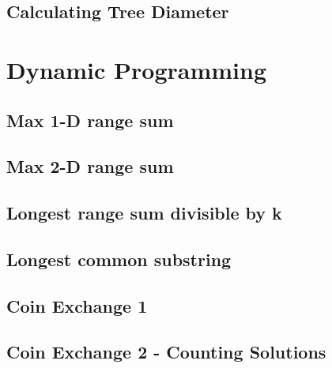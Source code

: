 	\subsection{Calculating Tree Diameter}


\section{Dynamic Programming}
	\subsection{Max 1-D range sum}
	\subsection{Max 2-D range sum}
	\subsection{Longest range sum divisible by k}
	\subsection{Longest common substring}
	\subsection{Coin Exchange 1}
	\subsection{Coin Exchange 2 - Counting Solutions}
